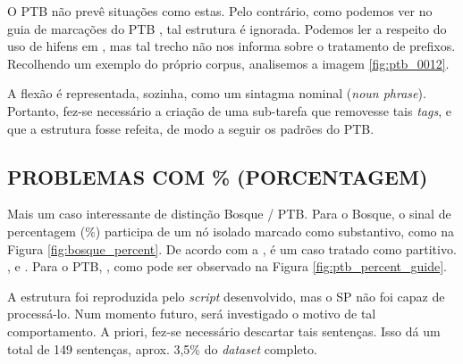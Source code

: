 \begin{center}
    
\end{center}

O PTB não prevê situações como estas. Pelo contrário, como podemos ver no guia de marcações do PTB , tal estrutura é ignorada. Podemos ler a respeito do uso de hifens em , mas tal trecho não nos informa sobre o tratamento de prefixos. Recolhendo um exemplo do próprio corpus, analisemos a imagem \ref{fig:ptb_0012}.

\begin{center}
    
\end{center}

A flexão  é representada, sozinha, como um sintagma nominal (\textit{noun phrase}). Portanto, fez-se necessário a criação de uma sub-tarefa que removesse tais \textit{tags}, e que a estrutura fosse refeita, de modo a seguir os padrões do PTB.

\subsection{PROBLEMAS COM \% (PORCENTAGEM)}
\label{subsec:percent}
Mais um caso interessante de distinção Bosque / PTB. Para o Bosque, o sinal de percentagem (\%) participa de um nó isolado marcado como substantivo, como na Figura \ref{fig:bosque_percent}. De acordo com a , é um caso tratado como partitivo. , e . Para o PTB, , como pode ser observado na Figura \ref{fig:ptb_percent_guide}.
\begin{center}
    
\end{center}
A estrutura foi reproduzida pelo \textit{script} desenvolvido, mas o SP não foi capaz de processá-lo. Num momento futuro, será investigado o motivo de tal comportamento. A priori, fez-se necessário descartar tais sentenças. Isso dá um total de 149 sentenças, aprox. 3,5\% do \textit{dataset} completo.
\begin{center}
    
\end{center}
